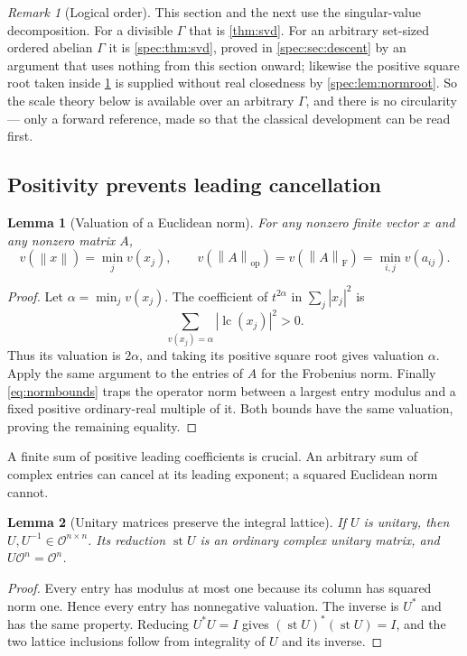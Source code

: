 \documentclass[11pt,a4paper]{article}
\numberwithin{equation}{section}
\newtheorem{lemma}[lemma]{Lemma}
\theoremstyle{definition}
\theoremstyle{remark}
\newtheorem{remark}[remark]{Remark}
\newcommand{\OO}{\mathcal O}
\newcommand{\st}{\operatorname{st}}
\newcommand{\lc}{\operatorname{lc}}
\newcommand{\op}{\mathrm{op}}
\newcommand{\Fr}{\mathrm F}
\newcommand{\norm}[1]{\left\lVert#1\right\rVert}
\begin{document}
\begin{remark}[Logical order]\label{spec:rem:logicalorder}
This section and the next use the singular-value decomposition. For a
divisible $\Gamma$ that is \cref{thm:svd}. For an arbitrary set-sized
ordered abelian $\Gamma$ it is \cref{spec:thm:svd}, proved in
\cref{spec:sec:descent} by an argument that uses nothing from this section
onward; likewise the positive square root taken inside \cref{lem:valnorm}
is supplied without real closedness by \cref{spec:lem:normroot}. So the
scale theory below is available over an arbitrary $\Gamma$, and there is no
circularity --- only a forward reference, made so that the classical
development can be read first.
\end{remark}

\subsection{Positivity prevents leading cancellation}
\begin{lemma}[Valuation of a Euclidean norm]\label{lem:valnorm}
For any nonzero finite vector $x$ and any nonzero matrix $A$,
\begin{equation}\label{eq:valnorm}
 v(\norm x)=\min_jv(x_j),\qquad
 v(\norm A_{\op})=v(\norm A_{\Fr})=\min_{i,j}v(a_{ij}).
\end{equation}
\end{lemma}
\begin{proof}
Let $\alpha=\min_jv(x_j)$. The coefficient of $t^{2\alpha}$ in
$\sum_j|x_j|^2$ is
\[
 \sum_{v(x_j)=\alpha}|\lc(x_j)|^2>0.
\]
Thus its valuation is $2\alpha$, and taking its positive square root gives
valuation $\alpha$. Apply the same argument to the entries of $A$ for the
Frobenius norm. Finally \eqref{eq:normbounds} traps the operator norm
between a largest entry modulus and a fixed positive ordinary-real multiple
of it. Both bounds have the same valuation, proving the remaining equality.
\end{proof}

A finite sum of positive leading coefficients is crucial. An arbitrary sum
of complex entries can cancel at its leading exponent; a squared Euclidean
norm cannot.

\begin{lemma}[Unitary matrices preserve the integral lattice]\label{lem:unitaryintegral}
If $U$ is unitary, then $U,U^{-1}\in\OO^{n\times n}$. Its reduction
$\st U$ is an ordinary complex unitary matrix, and
$U\OO^n=\OO^n$.
\end{lemma}
\begin{proof}
Every entry has modulus at most one because its column has squared norm
one. Hence every entry has nonnegative valuation. The inverse is $U^*$ and
has the same property. Reducing $U^*U=I$ gives
$(\st U)^*(\st U)=I$, and the two lattice inclusions follow from integrality
of $U$ and its inverse.
\end{proof}
\end{document}
